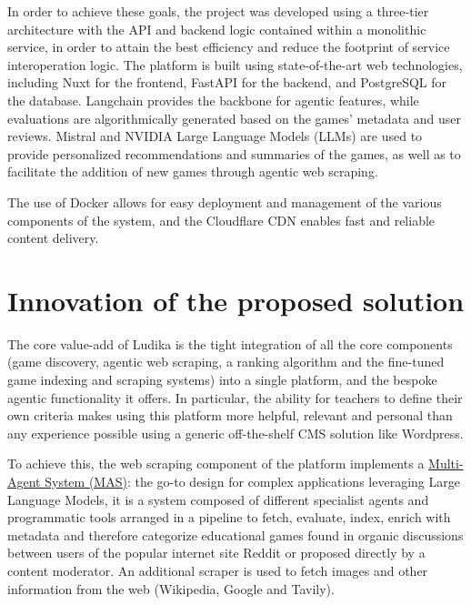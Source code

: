 \documentclass[11pt,italian,a4paper]{article}
\newcommand{\todo}[1]{\noindent {\Huge \color{orange} TODO -- #1}}
\begin{document}
In order to achieve these goals, the project was developed using a three-tier architecture with the API and backend logic contained within a monolithic service, in order to attain the best efficiency and reduce the footprint of service interoperation logic. The platform is built using state-of-the-art web technologies, including Nuxt for the frontend, FastAPI for the backend, and PostgreSQL for the database. Langchain provides the backbone for agentic features, while evaluations are algorithmically generated based on the games' metadata and user reviews. Mistral and NVIDIA Large Language Models (LLMs) are used to provide personalized recommendations and summaries of the games, as well as to facilitate the addition of new games through agentic web scraping.

The use of Docker allows for easy deployment and management of the various components of the system, and the Cloudflare CDN enables fast and reliable content delivery.


\section{Innovation of the proposed solution}

The core value-add of Ludika is the tight integration of all the core components (game discovery, agentic web scraping, a ranking algorithm and the fine-tuned game indexing and scraping systems) into a single platform, and the bespoke agentic functionality it offers. In particular, the ability for teachers to define their own criteria makes using this platform more helpful, relevant and personal than any experience possible using a generic off-the-shelf CMS solution like Wordpress.

To achieve this, the web scraping component of the platform implements a \href{https://en.wikipedia.org/wiki/Multi-agent_system}{Multi-Agent System (MAS)}: the go-to design for complex applications leveraging Large Language Models, it is a system composed of different specialist agents and programmatic tools arranged in a pipeline to fetch, evaluate, index, enrich with metadata and therefore categorize educational games found in organic discussions between users of the popular internet site Reddit or proposed directly by a content moderator. An additional scraper is used to fetch images and other information from the web (Wikipedia, Google and Tavily).
\end{document}
